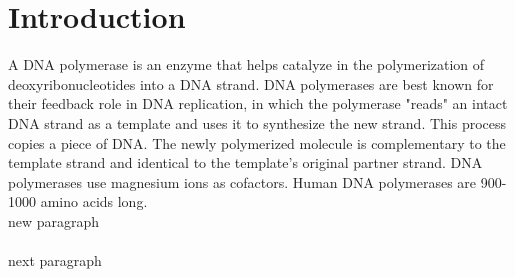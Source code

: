\thispagestyle{plain}
\section{Introduction}
A DNA polymerase is an enzyme that helps catalyze in the polymerization of deoxyribonucleotides into a DNA strand. DNA polymerases are best known for their feedback role in DNA replication, in which the polymerase "reads" an intact DNA strand as a template and uses it to synthesize the new strand. This process copies a piece of DNA. The newly polymerized molecule is complementary to the template strand and identical to the template's original partner strand. DNA polymerases use magnesium ions as cofactors. Human DNA polymerases are 900-1000 amino acids long. \\

new paragraph\\
\ \\
next paragraph


